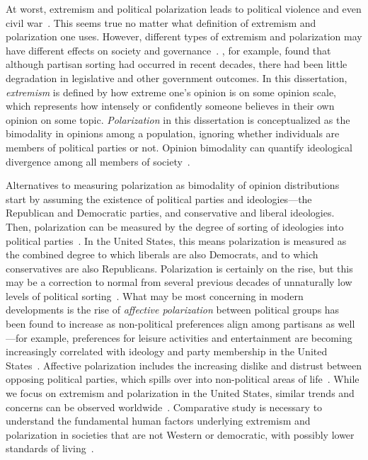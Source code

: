 \documentclass[12pt,letterpaper]{article}
\begin{document}
At worst, extremism and political
polarization leads to political violence and even civil war~\cite{Epstein2013,Freeman2018}.
This seems true no matter what definition of extremism and polarization one
uses. However, different types of extremism and polarization may have different
effects on society and governance~\cite{Lelkes2016}. , for example,
found that although partisan sorting had occurred in recent decades, there
had been little degradation in legislative and other government outcomes.
In this dissertation, \emph{extremism} is defined by how extreme one's opinion is on some opinion 
scale, which represents how intensely or confidently someone believes in their
own opinion on some topic. \emph{Polarization} in this dissertation is 
conceptualized as the bimodality in opinions among a population, ignoring 
whether individuals are members of political parties or not. Opinion bimodality
can quantify ideological divergence among all members of society~\cite{Bramson2016,Lelkes2016}. 

Alternatives to measuring polarization as bimodality of opinion distributions
start by assuming the existence of political parties and ideologies---the 
Republican and Democratic parties, and conservative and liberal ideologies.
Then, polarization can be measured by the degree of sorting of ideologies
into political parties~\cite{Mason2015}. 
In the United States, this means polarization is measured
as the combined degree to which liberals are also Democrats, and to which 
conservatives are also Republicans. Polarization is certainly on the rise,
but this may be a correction to normal from several previous decades of 
unnaturally low levels of political sorting~\cite{Lee2015,Wood2017b}.
What may be most concerning in modern developments is the rise of
\emph{affective polarization} between political groups has been found to increase as non-political
preferences align among partisans as well---for example, preferences for
leisure activities and entertainment are becoming increasingly correlated
with ideology and party membership in the United States~\cite{Pew2014,DellaPosta2015}.
Affective polarization includes the increasing dislike and distrust between opposing political parties, 
which spills over into non-political areas of life~\cite{Iyengar2019}. 
While we focus on extremism and polarization in the United States, similar trends and concerns can be observed 
worldwide~\cite{Borge-Holthoefer2015,Morales2015,Romenskyy2017,Zmigrod2018}. 
Comparative study is necessary to understand the fundamental human factors underlying
extremism and polarization in societies that are not Western or democratic,
with possibly lower standards of living~\cite{Henrich2010}.
\end{document}
